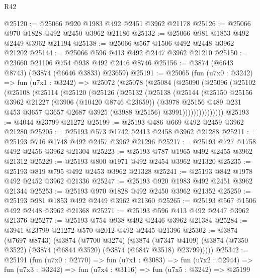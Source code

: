 \begin{lexlean}{R42}
\begin{coremodule}
@25120 := @25066 @920 @1983 @492 @2451 @3962 @21178
@25126 := @25066 @970 @1828 @492 @2450 @3962 @21186
@25132 := @25066 @981 @1853 @492 @2449 @3962 @21194
@25138 := @25066 @567 @1506 @492 @2448 @3962 @21202
@25144 := @25066 @596 @413 @492 @2447 @3962 @21210
@25150 := @23660 @21106 @754 @938 @492 @2446 @8746
@25156 := @3874 (@6643 @8743) (@3874 (@6646 @3833) @23659)
@25191 := @25065
    (fun (u7x0 : @3242) =>
    fun (u7x1 : @3242) =>
    @25072
      (@25078
        (@25084
          (@25090
            (@25096
              (@25102
                (@25108
                  (@25114
                    (@25120
                      (@25126
                        (@25132
                          (@25138
                            (@25144
                              (@25150
                                @25156
                                @3962
                                @21227
                                (@3906 (@10420 @8746 @23659))
                                (@3978
                                  @25156
                                  @489
                                  @231
                                  @453
                                  @3657
                                  @3657
                                  @2687
                                  @3925
                                  (@3988 @25156)
                                  @3991)))))))))))))))
@25193 := @4044 @23799 @21272
@25199 := @25193 @486 @669 @492 @2459 @3962 @21280
@25205 := @25193 @573 @1742 @2413 @2458 @3962 @21288
@25211 := @25193 @716 @1748 @492 @2457 @3962 @21296
@25217 := @25193 @727 @1758 @492 @2456 @3962 @21304
@25223 := @25193 @787 @1965 @492 @2455 @3962 @21312
@25229 := @25193 @800 @1971 @492 @2454 @3962 @21320
@25235 := @25193 @819 @795 @492 @2453 @3962 @21328
@25241 := @25193 @842 @1978 @492 @2452 @3962 @21336
@25247 := @25193 @920 @1983 @492 @2451 @3962 @21344
@25253 := @25193 @970 @1828 @492 @2450 @3962 @21352
@25259 := @25193 @981 @1853 @492 @2449 @3962 @21360
@25265 := @25193 @567 @1506 @492 @2448 @3962 @21368
@25271 := @25193 @596 @413 @492 @2447 @3962 @21376
@25277 := @25193 @754 @938 @492 @2446 @3962 @21384
@25284 := @3941 @23799 @21272 @570 @2012 @492 @2445 @21396
@25302 := @3874
    (@7697 @8743)
    (@3874
      (@7700 @3274)
      (@3874
        (@7347 @4109)
        (@3874 (@7350 @3522) (@3874 (@6844 @3520) (@3874 (@6847 @3518) @23799)))))
@25342 := @25191
    (fun (u7x0 : @2770) =>
    fun (u7x1 : @3083) =>
    fun (u7x2 : @2944) =>
    fun (u7x3 : @3242) =>
    fun (u7x4 : @3116) =>
    fun (u7x5 : @3242) =>
    @25199

\end{coremodule}
\end{lexlean}
